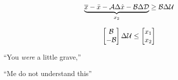  \begin{equation}
 	\underbrace{\overline{x}-\bar{x}-\CMcal{A}\Delta\hat{x}-\CMcal{B}\Delta\CMcal{D}}_{x_2}\geq \CMcal{B}\Delta\CMcal{U}
 \end{equation}


 \begin{equation}
    	\begin{bmatrix}
	   	\CMcal{B}\\
	   	-\CMcal{B}
	   	\end{bmatrix}
	   	\Delta\CMcal{U}
	   	\leq 
	   	\begin{bmatrix}
 		x_1\\
 		x_2
	   	\end{bmatrix}
 \end{equation}

``You \emph{were} a little grave,''

``Me do not understand this''